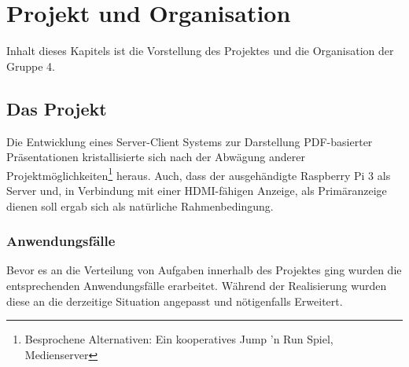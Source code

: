 \chapter{Projekt und Organisation}
\thispagestyle{fancy}
\label{ProjektOrganisation}
Inhalt dieses Kapitels ist die Vorstellung des Projektes und die Organisation der Gruppe 4.
\section{Das Projekt}
\label{DasProjekt}
Die Entwicklung eines Server-Client Systems zur Darstellung PDF-basierter Präsentationen kristallisierte sich nach der Abwägung anderer Projektmöglichkeiten\footnote{Besprochene Alternativen: Ein kooperatives Jump 'n Run Spiel, Medienserver} heraus.
Auch, dass der ausgehändigte \glqq Raspberry Pi 3 \grqq als Server und, in Verbindung mit einer HDMI-fähigen Anzeige, als Primäranzeige dienen soll ergab sich als natürliche Rahmenbedingung.
\subsection{Anwendungsfälle}
\label{Anwendungsfälle}
Bevor es an die Verteilung von Aufgaben innerhalb des Projektes ging wurden die entsprechenden Anwendungsfälle erarbeitet.
Während der Realisierung wurden diese an die derzeitige Situation angepasst und nötigenfalls Erweitert.\\


